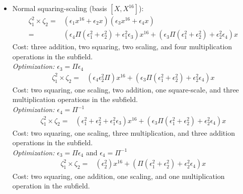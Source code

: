 \begin{itemize}
	\item Normal squaring-scaling (basis $[X, X^{16}]$): 
	\begin{align*}
	\zeta_1^2 \times \zeta_2 = & (\epsilon_1 x^{16} + \epsilon_2 x)(\epsilon_3 x^{16} + \epsilon_4 x) \\
	= & (\epsilon_4\Pi(\epsilon_1^2 + \epsilon_2^2) + \epsilon_1^2\epsilon_3) x^{16} + (\epsilon_3\Pi(\epsilon_1^2 + \epsilon_2^2) + \epsilon_2^2\epsilon_4) x
	\end{align*}
	Cost: three addition, two squaring, two scaling, and four multiplication operations in the subfield. \\
	\emph{Optimization:} $\epsilon_3 = \Pi\epsilon_4$
	\begin{align*}
	\zeta_1^2 \times \zeta_2 = & (\epsilon_4\epsilon_2^2\Pi) x^{16} + (\epsilon_3\Pi(\epsilon_1^2 + \epsilon_2^2) + \epsilon_2^2\epsilon_4)x
	\end{align*}
	Cost: two squaring, one scaling, two addition, one square-scale, and three multiplication operations in the subfield. \\
	\emph{Optimization:} $\epsilon_4 = \Pi^{-1}$
	\begin{align*}
	\zeta_1^2 \times \zeta_2 = & (\epsilon_1^2 + \epsilon_2^2 + \epsilon_1^2\epsilon_3)x^{16} + (\epsilon_3\Pi(\epsilon_1^2 + \epsilon_2^2) + \epsilon_2^2\epsilon_4) x
	\end{align*}
	Cost: two squaring, one scaling, three multiplication, and three addition operations in the subfield. \\
	\emph{Optimization:} $\epsilon_3 = \Pi\epsilon_4$ and $\epsilon_4 = \Pi^{-1}$
	\begin{align*}
	\zeta_1^2 \times \zeta_2 = & (\epsilon_2^2) x^{16} + (\Pi(\epsilon_1^2 + \epsilon_2^2) + \epsilon_2^2\epsilon_4) x
	\end{align*}
	Cost: two squaring, one addition, one scaling, and one multiplication operation in the subfield.
\end{itemize}

